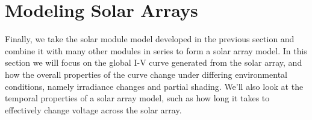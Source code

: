 \section{Modeling Solar Arrays}\label{sec:modeling_solar_arrays}

Finally, we take the solar module model developed in the previous section and
combine it with many other modules in series to form a solar array model. In
this section we will focus on the global \ac{I-V} curve generated from the solar
array, and how the overall properties of the curve change under differing
environmental conditions, namely irradiance changes and partial shading. We'll
also look at the temporal properties of a solar array model, such as how long it
takes to effectively change voltage across the solar array.




